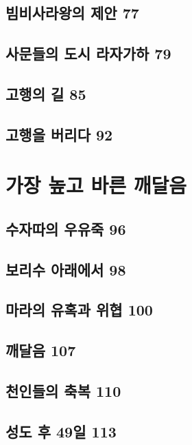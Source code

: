 \documentclass[12pt, a4paper, oneside]{book}
\let\stdsection\section
\renewcommand\section{\newpage\stdsection}
\begin{document}
	\section{빔비사라왕의 제안 77 }

	\section{사문들의 도시 라자가하 79 }

	\section{고행의 길 85 }

	\section{고행을 버리다 92	}





	\chapter{가장 높고 바른 깨달음}
	\noptcrule
	\parttoc				

	\section{수자따의 우유죽 96 }

	\section{보리수 아래에서 98 }

	\section{마라의 유혹과 위협 100 }

	\section{깨달음 107 }

	\section{천인들의 축복 110 }

	\section{성도 후 49일 113 }
\end{document}
